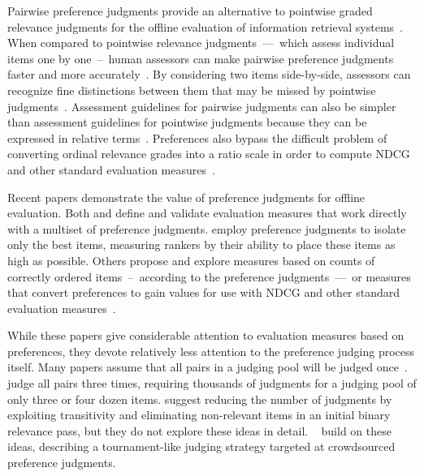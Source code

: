Pairwise preference judgments provide an alternative to pointwise graded relevance judgments for the offline evaluation of information retrieval systems~\cite{cbcd08,cvs21,sz20,xie20,hb17a,rcmd22}. When compared to pointwise relevance judgments~---~which assess individual items one by one~--~human assessors can make pairwise preference judgments faster and more accurately~\cite{cbcd08}. By considering two items side-by-side, assessors can recognize fine distinctions between them that may be missed by pointwise judgments~\cite{cvs21,Bah}. Assessment guidelines for pairwise judgments can also be simpler than assessment guidelines for pointwise judgments because they can be expressed in relative terms~\cite{cvs21}. Preferences also bypass the difficult problem of converting ordinal relevance grades into a ratio scale in order to compute NDCG and other standard evaluation measures~\cite{ka09,mmst17,fff21,reviewer0,reviewer1}. 

Recent papers demonstrate the value of preference judgments for offline evaluation. Both \citet{sz20} and \citet{lcs21} define and validate evaluation measures that work directly with a multiset of preference judgments. \citet{avyc21} employ preference judgments to isolate only the best items, measuring rankers by their ability to place these items as high as possible. Others propose and explore measures based on counts of correctly ordered items~--~according to the preference judgments~---~or measures that convert preferences to gain values for use with NDCG and other standard evaluation measures~\cite{sz20,ymt18,xie20,cb08}.

While these papers give considerable attention to evaluation measures based on preferences, they devote relatively less attention to the preference judging process itself. Many papers assume that all pairs in a judging pool will be judged once~\cite{avyc21, cbcd08, sz20}. \citet{sz20} judge all pairs three times, requiring thousands of judgments for a judging pool of only three or four dozen items. \citet{cbcd08} suggest reducing the number of judgments by exploiting transitivity and eliminating non-relevant items in an initial binary relevance pass, but they do not explore these ideas in detail. ~\citet{cvs21} build on these ideas, describing a tournament-like judging strategy targeted at crowdsourced preference judgments.

